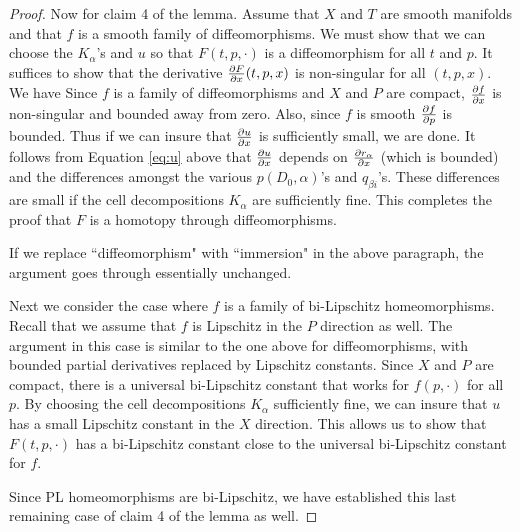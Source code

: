\begin{proof}
\medskip

Now for claim 4 of the lemma.
Assume that $X$ and $T$ are smooth manifolds and that $f$ is a smooth family of diffeomorphisms.
We must show that we can choose the $K_\alpha$'s and $u$ so that $F(t, p, \cdot)$ is a 
diffeomorphism for all $t$ and $p$.
It suffices to 
show that the derivative $\frac{\partial F}{\partial x}(t, p, x)$ is non-singular for all $(t, p, x)$.
We have
Since $f$ is a family of diffeomorphisms and $X$ and $P$ are compact, 
$\frac{\partial f}{\partial x}$ is non-singular and bounded away from zero.
Also, since $f$ is smooth $\frac{\partial f}{\partial p}$ is bounded.
Thus if we can insure that $\frac{\partial u}{\partial x}$ is sufficiently small, we are done.
It follows from Equation \eqref{eq:u} above that $\frac{\partial u}{\partial x}$ depends on $\frac{\partial r_\alpha}{\partial x}$
(which is bounded)
and the differences amongst the various $p(D_0,\alpha)$'s and $q_{\beta i}$'s.
These differences are small if the cell decompositions $K_\alpha$ are sufficiently fine.
This completes the proof that $F$ is a homotopy through diffeomorphisms.

If we replace ``diffeomorphism" with ``immersion" in the above paragraph, the argument goes
through essentially unchanged.

Next we consider the case where $f$ is a family of bi-Lipschitz homeomorphisms.
Recall that we assume that $f$ is Lipschitz in the $P$ direction as well.
The argument in this case is similar to the one above for diffeomorphisms, with
bounded partial derivatives replaced by Lipschitz constants.
Since $X$ and $P$ are compact, there is a universal bi-Lipschitz constant that works for 
$f(p, \cdot)$ for all $p$.
By choosing the cell decompositions $K_\alpha$ sufficiently fine,
we can insure that $u$ has a small Lipschitz constant in the $X$ direction.
This allows us to show that $F(t, p, \cdot)$ has a bi-Lipschitz constant
close to the universal bi-Lipschitz constant for $f$.

Since PL homeomorphisms are bi-Lipschitz, we have established this last remaining case of claim 4 of the lemma as well.
\end{proof}

